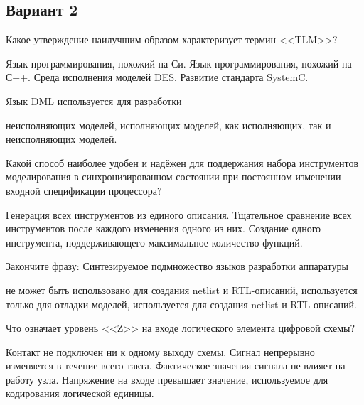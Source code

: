 \subsection*{Вариант 2}

\begin{questions}

\question[3] Какое утверждение наилучшим образом характеризует термин <<TLM>>?
\begin{choices}
    \choice Язык программирования, похожий на Си.
    \choice Язык программирования, похожий на С++.
    \choice Среда исполнения моделей DES.
    \correctchoice Развитие стандарта SystemC.
\end{choices}

\question[3] Язык DML используется для разработки
\begin{choices}
    \correctchoice неисполняющих моделей,
    \choice исполняющих моделей,
    \choice как исполняющих, так и неисполняющих моделей.
\end{choices}

\question[3] Какой способ наиболее удобен и надёжен для поддержания набора инструментов моделирования в синхронизированном состоянии при постоянном изменении входной спецификации процессора?
\begin{choices}
    \correctchoice Генерация всех инструментов из единого описания.
    \choice Тщательное сравнение всех инструментов после каждого изменения одного из них.
    \choice Создание одного инструмента, поддерживающего максимальное количество функций.
\end{choices}

\question[3] Закончите фразу: Синтезируемое подмножество языков разработки аппаратуры
\begin{choices}
\choice не может быть использовано для создания netlist и RTL-описаний,
\choice используется только для отладки моделей,
\correctchoice  используется для создания netlist и RTL-описаний.
\end{choices}

\question[3] Что означает уровень <<Z>> на входе логического элемента цифровой схемы?
\begin{choices}
    \correctchoice Контакт не подключен ни к одному выходу схемы.
	\choice Сигнал непрерывно изменяется в течение всего такта.
    \choice Фактическое значения сигнала не влияет на работу узла.
	\choice Напряжение на входе превышает значение, используемое для кодирования логической единицы.
\end{choices}

\end{questions}


